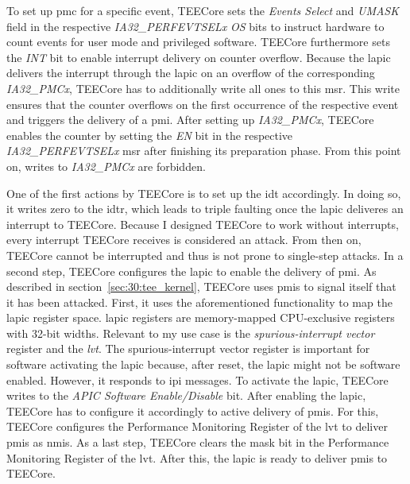 To set up \gls{pmc} for a specific event, TEECore sets the \textit{Events
Select} and \textit{UMASK} field in the respective \textit{IA32\_PERFEVTSELx}
\textit{OS} bits to instruct hardware to count events for user mode and
privileged software. TEECore furthermore sets the \textit{INT} bit to enable
interrupt delivery on counter overflow. Because the \gls{lapic} delivers the
interrupt through the \gls{lapic} on an overflow of the corresponding
\textit{IA32\_PMCx}, TEECore has to additionally write all ones to this
\gls{msr}. This write ensures that the counter overflows on the first
occurrence of the respective event and triggers the delivery of a \gls{pmi}.
After setting up \textit{IA32\_PMCx}, TEECore enables the counter by setting
the \textit{EN} bit in the respective \textit{IA32\_PERFEVTSELx} \gls{msr}
after finishing its preparation phase. From this point on, writes to
\textit{IA32\_PMCx} are forbidden.

One of the first actions by TEECore is to set up the \gls{idt} accordingly. In
doing so, it writes zero to the \gls{idtr}, which leads to triple faulting once
the \gls{lapic} deliveres an interrupt to TEECore. Because I designed TEECore to
work without interrupts, every interrupt TEECore receives is considered an
attack. From then on, TEECore cannot be interrupted and thus is not prone to
single-step attacks. In a second step, TEECore configures the \gls{lapic} to
enable the delivery of \gls{pmi}. As described in
section~\ref{sec:30:tee_kernel}, TEECore uses \glspl{pmi} to signal itself that
it has been attacked. First, it uses the aforementioned functionality to map the
\gls{lapic} register space. \gls{lapic} registers are memory-mapped
CPU-exclusive registers with 32-bit widths. Relevant to my use case is the
\textit{spurious-interrupt vector} register and the \textit{\gls{lvt}}. The
spurious-interrupt vector register is important for software activating the
\gls{lapic} because, after reset, the \gls{lapic} might not be software enabled.
However, it responds to \gls{ipi} messages. To activate the \gls{lapic}, TEECore
writes to the \textit{APIC Software Enable/Disable} bit. After enabling the
\gls{lapic}, TEECore has to configure it accordingly to active delivery of
\glspl{pmi}. For this, TEECore configures the Performance Monitoring Register of
the \gls{lvt} to deliver \glspl{pmi} as \glspl{nmi}. As a last step, TEECore
clears the mask bit in the Performance Monitoring Register of the \gls{lvt}.
After this, the \gls{lapic} is ready to deliver \glspl{pmi} to TEECore.\\

